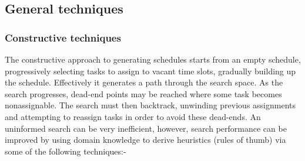 \subsection{General techniques}
\label{sub:reviw_general}
\subsubsection{Constructive techniques}
\label{sub:review_constructive}

The constructive approach to generating schedules starts from an empty schedule, progressively selecting tasks to assign to vacant time slots, gradually building up the schedule. Effectively it generates a path through the search space. As the search progresses, dead-end points may be reached where some task becomes nonassignable. The search must then backtrack, unwinding previous assignments and attempting to reassign tasks in order to avoid these dead-ends. An uninformed search can be very inefficient, however, search performance can be improved by using domain knowledge to derive heuristics (rules of thumb) via some of the following techniques:- 

